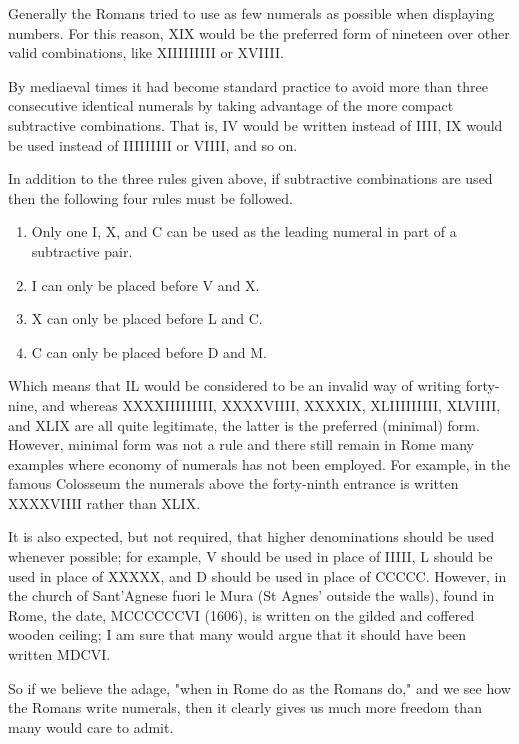 Generally the Romans tried to use as few numerals as possible when
displaying numbers. For this reason, {XIX} would be the preferred form
of nineteen over other valid combinations, like {XIIIIIIIII} or
{XVIIII}.

By mediaeval times it had become standard practice to avoid more than
three consecutive identical numerals by taking advantage of the more
compact subtractive combinations. That is, {IV} would be written instead
of {IIII}, {IX} would be used instead of {IIIIIIIII} or {VIIII}, and so
on.

In addition to the three rules given above, if subtractive combinations
are used then the following four rules must be followed.

\begin{enumerate}
\def\labelenumi{\roman{enumi}.}
\tightlist
\item
  Only one {I}, {X}, and {C} can be used as the leading numeral in part
  of a subtractive pair.
\item
  {I} can only be placed before {V} and {X}.
\item
  {X} can only be placed before {L} and {C}.
\item
  {C} can only be placed before {D} and {M}.
\end{enumerate}

Which means that {IL} would be considered to be an invalid way of
writing forty-nine, and whereas {XXXXIIIIIIIII}, {XXXXVIIII}, {XXXXIX},
{XLIIIIIIIII}, {XLVIIII}, and {XLIX} are all quite legitimate, the
latter is the preferred (minimal) form. However, minimal form was not a
rule and there still remain in Rome many examples where economy of
numerals has not been employed. For example, in the famous Colosseum the
numerals above the forty-ninth entrance is written {XXXXVIIII} rather
than {XLIX}.

It is also expected, but not required, that higher denominations should
be used whenever possible; for example, {V} should be used in place of
{IIIII}, {L} should be used in place of {XXXXX}, and {D} should be used
in place of {CCCCC}. However, in the church of Sant'Agnese fuori le Mura
(St Agnes' outside the walls), found in Rome, the date, {MCCCCCCVI}
(1606), is written on the gilded and coffered wooden ceiling; I am sure
that many would argue that it should have been written {MDCVI}.

So if we believe the adage, "when in Rome do as the Romans do," and we
see how the Romans write numerals, then it clearly gives us much more
freedom than many would care to admit.
